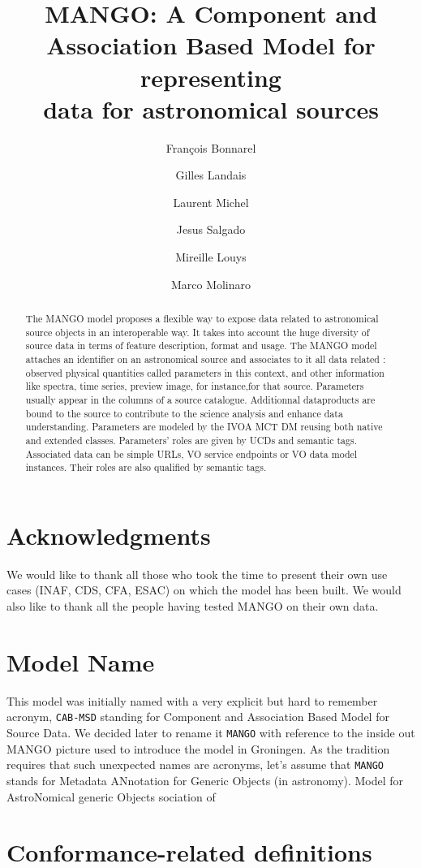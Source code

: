 \documentclass[11pt,a4paper]{ivoa}
\title{MANGO: A Component and Association Based Model for representing \\data for astronomical sources}
\author{François Bonnarel}
\author{Gilles Landais}
\author{Laurent Michel}
\author{Jesus Salgado}
\author{Mireille Louys}
\author{Marco Molinaro}
\begin{document}
\begin{abstract}
The MANGO model proposes a flexible way to expose data related to astronomical source objects in an interoperable way.
It takes into account the huge diversity of source data in terms of feature description, format and usage.
The MANGO model attaches an identifier on an astronomical source and associates to it all data related : observed physical quantities called parameters in this context, and other information like spectra, time series, preview image, for instance,for that source.
Parameters usually appear in the columns of a source catalogue. Additionnal dataproducts are bound to the source to contribute to the science analysis and enhance data understanding.
Parameters are modeled by the IVOA MCT DM reusing both native and extended classes. Parameters' roles are given by UCDs and semantic tags.
Associated data can be simple URLs, VO service endpoints or VO data model instances. Their roles are also qualified by semantic tags.
\end{abstract}


\section*{Acknowledgments}

We would like to thank all those who took the time to present their own use cases (INAF, CDS, CFA, ESAC) on which the model has been built.
We would also like to thank all the people having tested MANGO on their own data.

\section*{Model Name}
This model was initially named with a very explicit but hard to remember acronym, \texttt{CAB-MSD} standing for Component and Association Based Model for Source Data. We decided later to rename it \texttt{MANGO} with reference to the inside out MANGO picture used to introduce the model in Groningen. As the tradition requires that such unexpected names are acronyms, let's assume that \texttt{MANGO} stands for
Metadata ANnotation for Generic Objects (in astronomy).
Model for AstroNomical generic Objects sociation of


\section*{Conformance-related definitions}
\end{document}
